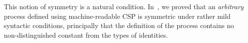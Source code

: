 This notion of symmetry is a natural condition.  In~\cite{gavin-tom-symmetry},
we proved that an \emph{arbitrary} process defined using machine-readable CSP
is symmetric under rather mild syntactic conditions, principally that the
definition of the process contains no non-distinguished constant from the
types of identities.









